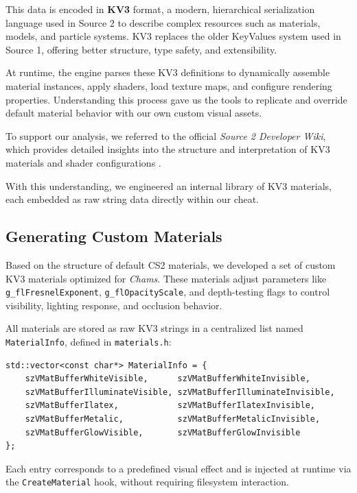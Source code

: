 This data is encoded in \textbf{KV3} format, a modern, hierarchical serialization language used in Source 2 to describe complex resources such as materials, models, and particle systems. KV3 replaces the older KeyValues system used in Source 1, offering better structure, type safety, and extensibility.

At runtime, the engine parses these KV3 definitions to dynamically assemble material instances, apply shaders, load texture maps, and configure rendering properties. Understanding this process gave us the tools to replicate and override default material behavior with our own custom visual assets.

To support our analysis, we referred to the official \textit{Source 2 Developer Wiki}, which provides detailed insights into the structure and interpretation of KV3 materials and shader configurations \cite{valve2021source2wiki}. 

With this understanding, we engineered an internal library of KV3 materials, each embedded as raw string data directly within our cheat. 

\subsection{Generating Custom Materials}

Based on the structure of default CS2 materials, we developed a set of custom KV3 materials optimized for \textit{Chams}. These materials adjust parameters like \texttt{g\_flFresnelExponent}, \texttt{g\_flOpacityScale}, and depth-testing flags to control visibility, lighting response, and occlusion behavior.

All materials are stored as raw KV3 strings in a centralized list named \texttt{MaterialInfo}, defined in \texttt{materials.h}:

\begin{lstlisting}[style=cppstyle, caption={List of Custom Materials}]
std::vector<const char*> MaterialInfo = { 
    szVMatBufferWhiteVisible,      szVMatBufferWhiteInvisible,
    szVMatBufferIlluminateVisible, szVMatBufferIlluminateInvisible,
    szVMatBufferIlatex,            szVMatBufferIlatexInvisible,
    szVMatBufferMetalic,           szVMatBufferMetalicInvisible,
    szVMatBufferGlowVisible,       szVMatBufferGlowInvisible
};
\end{lstlisting}

Each entry corresponds to a predefined visual effect and is injected at runtime via the \texttt{CreateMaterial} hook, without requiring filesystem interaction.

